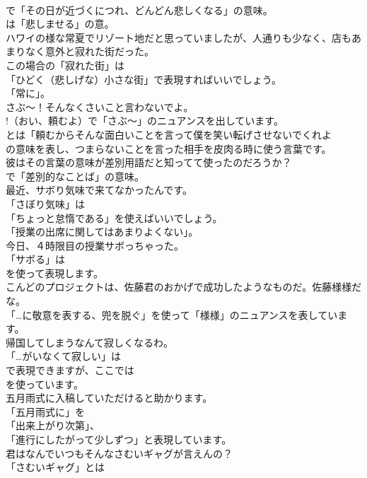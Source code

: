 \documentclass[8pt]{extreport}
\begin{document}
\begin{CJK}{UTF8}{min}
\\	で「その日が近づくにつれ、どんどん悲しくなる」の意味。
\\	は「悲しませる」の意。	
\\	ハワイの様な常夏でリゾート地だと思っていましたが、人通りも少なく、店もあまりなく意外と寂れた街だった。 
\\	この場合の「寂れた街」は
\\	「ひどく（悲しげな）小さな街」で表現すればいいでしょう。
\\	「常に」。	
\\	さぶ～！そんなくさいこと言わないでよ。 
\\	!（おい、頼むよ）で「さぶ～」のニュアンスを出しています。
\\	とは「頼むからそんな面白いことを言って僕を笑い転げさせないでくれよ
\\	の意味を表し、つまらないことを言った相手を皮肉る時に使う言葉です。	
\\	彼はその言葉の意味が差別用語だと知ってて使ったのだろうか？ 
\\	で「差別的なことば」の意味。	
\\	最近、サボり気味で来てなかったんです。 
\\	「さぼり気味」は
\\	「ちょっと怠惰である」を使えばいいでしょう。
\\	「授業の出席に関してはあまりよくない」。	
\\	今日、４時限目の授業サボっちゃった。 
\\	「サボる」は 
\\	を使って表現します。	
\\	こんどのプロジェクトは、佐藤君のおかげで成功したようなものだ。佐藤様様だな。 
\\	「…に敬意を表する、兜を脱ぐ」を使って「様様」のニュアンスを表しています。	
\\	帰国してしまうなんて寂しくなるわ。 
\\	「…がいなくて寂しい」は
\\	で表現できますが、ここでは
\\	を使っています。	
\\	五月雨式に入稿していただけると助かります。 
\\	「五月雨式に」を
\\	「出来上がり次第」、
\\	「進行にしたがって少しずつ」と表現しています。	
\\	君はなんでいつもそんなさむいギャグが言えんの？ 
\\	「さむいギャグ」とは

\end{CJK}
\end{document}
